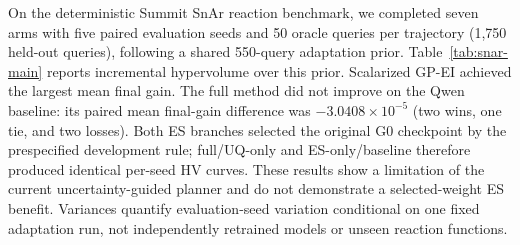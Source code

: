 On the deterministic Summit SnAr reaction benchmark, we completed seven arms with five paired evaluation seeds and 50 oracle queries per trajectory (1,750 held-out queries), following a shared 550-query adaptation prior. Table~\ref{tab:snar-main} reports incremental hypervolume over this prior. Scalarized GP-EI achieved the largest mean final gain. The full method did not improve on the Qwen baseline: its paired mean final-gain difference was $-3.0408\times10^{-5}$ (two wins, one tie, and two losses). Both ES branches selected the original G0 checkpoint by the prespecified development rule; full/UQ-only and ES-only/baseline therefore produced identical per-seed HV curves. These results show a limitation of the current uncertainty-guided planner and do not demonstrate a selected-weight ES benefit. Variances quantify evaluation-seed variation conditional on one fixed adaptation run, not independently retrained models or unseen reaction functions.
